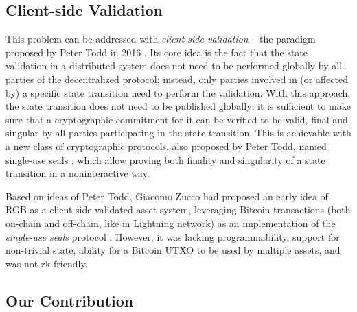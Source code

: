 \documentclass[9pt,oneside]{amsart}
\begin{document}
\begin{multicols}{2}
\subsection{Client-side Validation}

This problem can be addressed with \emph{client-side validation} –
the paradigm proposed by Peter Todd in 2016 \cite{CSV}.
Its core idea is the fact that the state validation in a distributed system
does not need to be performed globally by all parties of the decentralized protocol;
instead, only parties involved in (or affected by)
a specific state transition need to perform the validation.
With this approach, the state transition does not need to be published globally;
it is sufficient to make sure that a cryptographic commitment for it
can be verified to be valid, final and singular
by all parties participating in the state transition.
This is achievable with a new class of cryptographic protocols,
also proposed by Peter Todd, named single-use seals \cite{SUS1, SUS2, SUS3, SUS4},
which allow proving both finality and singularity\footnotemark
of a state transition in a noninteractive way.


Based on ideas of Peter Todd, Giacomo Zucco had proposed
an early idea of RGB as a client-side validated asset system,
leveraging Bitcoin transactions (both on-chain and off-chain, like in Lightning network)
as an implementation of the \emph{single-use seals} protocol \cite{Zucco}.
However, it was lacking programmability, support for non-trivial state,
ability for a Bitcoin UTXO to be used by multiple assets,
and was not zk-friendly.

\subsection{Our Contribution}


\end{multicols}
\end{document}
